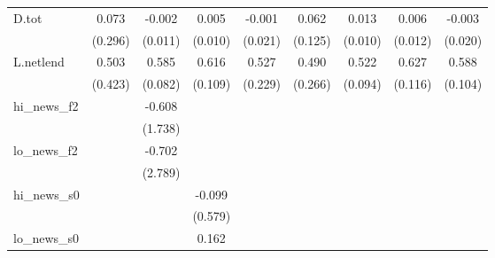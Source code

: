 {\begin{tabular}{l*{8}{c}}
\addlinespace
D.tot       &       0.073         &      -0.002         &       0.005         &      -0.001         &       0.062         &       0.013         &       0.006         &      -0.003         \\
            &     (0.296)         &     (0.011)         &     (0.010)         &     (0.021)         &     (0.125)         &     (0.010)         &     (0.012)         &     (0.020)         \\
\addlinespace
L.netlend   &       0.503         &       0.585\sym{***}&       0.616\sym{***}&       0.527\sym{**} &       0.490\sym{*}  &       0.522\sym{***}&       0.627\sym{***}&       0.588\sym{***}\\
            &     (0.423)         &     (0.082)         &     (0.109)         &     (0.229)         &     (0.266)         &     (0.094)         &     (0.116)         &     (0.104)         \\
\addlinespace
hi\_news\_f2  &                     &      -0.608         &                     &                     &                     &                     &                     &                     \\
            &                     &     (1.738)         &                     &                     &                     &                     &                     &                     \\
\addlinespace
lo\_news\_f2  &                     &      -0.702         &                     &                     &                     &                     &                     &                     \\
            &                     &     (2.789)         &                     &                     &                     &                     &                     &                     \\
\addlinespace
hi\_news\_s0  &                     &                     &      -0.099         &                     &                     &                     &                     &                     \\
            &                     &                     &     (0.579)         &                     &                     &                     &                     &                     \\
\addlinespace
lo\_news\_s0  &                     &                     &       0.162         &                     &                     &                     &                     &                     \\

\end{tabular}}
